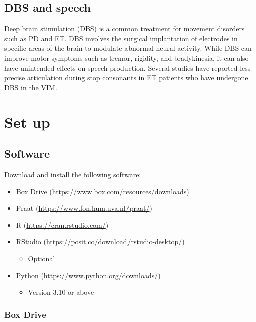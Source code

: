 \documentclass[
]{book}
\providecommand{\tightlist}{%
  \setlength{\itemsep}{0pt}\setlength{\parskip}{0pt}}
\begin{document}
\section{DBS and speech}\label{dbs-and-speech}

Deep brain stimulation (DBS) is a common treatment for movement disorders such as PD and ET. DBS involves the surgical implantation of electrodes in specific areas of the brain to modulate abnormal neural activity. While DBS can improve motor symptoms such as tremor, rigidity, and bradykinesia, it can also have unintended effects on speech production. Several studies have reported less precise articulation during stop consonants in ET patients who have undergone DBS in the VIM.

\chapter{Set up}\label{set-up}

\section{Software}\label{software}

Download and install the following software:

\begin{itemize}
\item
  Box Drive (\url{https://www.box.com/resources/downloads})
\item
  Praat (\url{https://www.fon.hum.uva.nl/praat/})
\item
  R (\url{https://cran.rstudio.com/})
\item
  RStudio (\url{https://posit.co/download/rstudio-desktop/})

  \begin{itemize}
  \tightlist
  \item
    Optional
  \end{itemize}
\item
  Python (\url{https://www.python.org/downloads/})

  \begin{itemize}
  \tightlist
  \item
    Version 3.10 or above
  \end{itemize}
\end{itemize}

\subsection{Box Drive}\label{box-drive}
\end{document}
